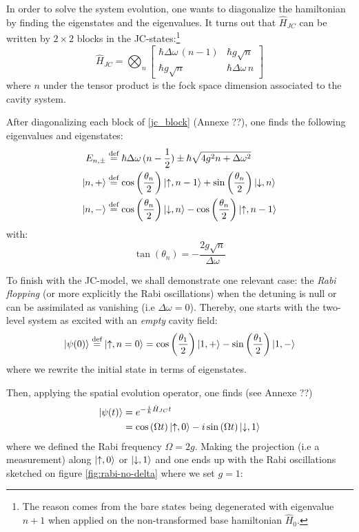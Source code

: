 \documentclass[10pt]{report}
\DeclarePairedDelimiter\ket{\lvert}{\rangle}
\begin{document}
In order to solve the system evolution, one wants to diagonalize the hamiltonian by finding the eigenstates and the eigenvalues. It turns out that $\hat{H}_{JC}$ can be written by $2\times 2$ blocks in the JC-states:\footnote{The reason comes from the bare states being degenerated with eigenvalue $n+1$ when applied on the non-transformed base hamiltonian $\hat{H}_0$.}
\begin{equation}
\label{jc_block}
\hat{H}_{JC} = \bigotimes_n \begin{bmatrix}
\hbar \Delta\omega \, (n-1) & \hbar g \sqrt{n}\\
\hbar g \sqrt{n} & \hbar \Delta\omega \, n
\end{bmatrix}
\end{equation}
where $n$ under the tensor product is the fock space dimension associated to the cavity system.

After diagonalizing each block of \eqref{jc_block} (Annexe ??), one finds the following eigenvalues and eigenstates:
\begin{align}
\label{jc_eigens}
E_{n, \pm} &\stackrel{\text{def}}{=} \hbar\Delta\omega\,(n-\frac{1}{2}) \pm \hbar\sqrt{4g^2n + \Delta\omega ^2}\\
\ket{n, +} &\stackrel{\text{def}}{=} \cos\left(\frac{\theta_n}{2}\right) \ket{\uparrow, n - 1}  + \sin\left(\frac{\theta_n}{2}\right) \ket{\downarrow, n}\\
\ket{n, -} &\stackrel{\text{def}}{=} \cos\left(\frac{\theta_n}{2}\right) \ket{\downarrow, n}  - \cos\left(\frac{\theta_n}{2}\right) \ket{\uparrow, n - 1}
\end{align}
with:
\begin{equation}
\label{tan_theta_n}
\tan\left(\theta_n\right) = -\frac{2g\sqrt{n}}{\Delta\omega}
\end{equation}

To finish with the JC-model, we shall demonstrate one relevant case: the \textit{Rabi flopping} (or more explicitly the Rabi oscillations) when the detuning is null or can be assimilated as vanishing (i.e $\Delta\omega = 0$). Thereby, one starts with the two-level system as excited with an \textit{empty} cavity field:
\begin{equation}
\ket{\psi(0)} \stackrel{\text{def}}{=} \ket{\uparrow, n = 0} = \cos\left(\frac{\theta_{1}}{2}\right) \ket{1, +} - \sin\left(\frac{\theta_{1}}{2}\right) \ket{1, -}
\end{equation}
where we rewrite the initial state in terms of eigenstates.

Then, applying the spatial evolution operator, one finds (see Annexe ??)
\begin{align}
\ket{\psi(t)} &= e^{-\frac{i}{\hbar}\hat{H}_{JC}t}\\
&= \cos\left(\Omega t\right) \ket{\uparrow, 0} - i \sin\left(\Omega t\right) \ket{\downarrow, 1}
\end{align}
where we defined the Rabi frequency $\Omega = 2g$. Making the projection (i.e a measurement) along $\ket{\uparrow, 0}$ or $\ket{\downarrow, 1}$ and one ends up with the Rabi oscillations sketched on figure  \ref{fig:rabi-no-delta} where we set $g=1$:
\end{document}
